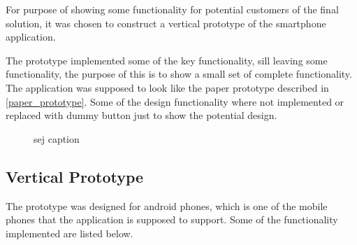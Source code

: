 For purpose of showing some functionality for potential customers of the final solution, it was chosen to construct a vertical prototype of the smartphone application.

The prototype implemented some of the key functionality, sill leaving some functionality, the purpose of this is to show a small set of complete functionality. The application was supposed to look like the paper prototype described in \cref{paper_prototype}. Some of the design functionality where not implemented or replaced with dummy button just to show the potential design.  

\begin{figure}[h!]
  \centering
  \caption{sej caption}
\end{figure}

\subsection{Vertical Prototype}
\label{sub:vertical_prototype}
The prototype was designed for android phones, which is one of the mobile phones that the application is supposed to support. Some of the functionality implemented are listed below. 
